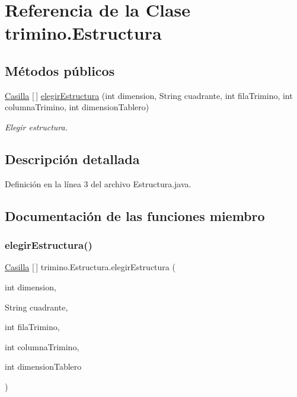 \hypertarget{classtrimino_1_1Estructura}{}\section{Referencia de la Clase trimino.\+Estructura}
\label{classtrimino_1_1Estructura}
\subsection*{Métodos públicos}
\begin{DoxyCompactItemize}
\item 
\mbox{\hyperlink{classtrimino_1_1Casilla}{Casilla}} \mbox{[}$\,$\mbox{]} \mbox{\hyperlink{classtrimino_1_1Estructura_a57ca625d499da9626af969cf4c0c9085}{elegir\+Estructura}} (int dimension, String cuadrante, int fila\+Trimino, int columna\+Trimino, int dimension\+Tablero)
\begin{DoxyCompactList}\small\item\em Elegir estructura. \end{DoxyCompactList}\end{DoxyCompactItemize}


\subsection{Descripción detallada}


Definición en la línea 3 del archivo Estructura.\+java.



\subsection{Documentación de las funciones miembro}
\mbox{\label{classtrimino_1_1Estructura_a57ca625d499da9626af969cf4c0c9085}} 
\subsubsection{\texorpdfstring{elegirEstructura()}{elegirEstructura()}}
{\footnotesize\ttfamily \mbox{\hyperlink{classtrimino_1_1Casilla}{Casilla}} \mbox{[}$\,$\mbox{]} trimino.\+Estructura.\+elegir\+Estructura (\begin{DoxyParamCaption}\item[{int}]{dimension,  }\item[{String}]{cuadrante,  }\item[{int}]{fila\+Trimino,  }\item[{int}]{columna\+Trimino,  }\item[{int}]{dimension\+Tablero }\end{DoxyParamCaption})}



